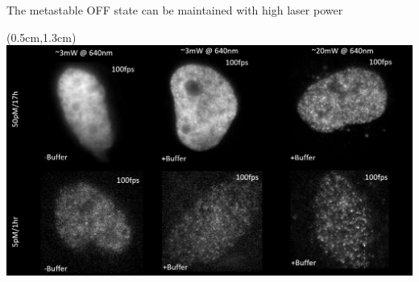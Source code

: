 \documentclass{beamer}					%
\begin{document}
\begin{frame}{The metastable OFF state can be maintained with high laser power}
\begin{textblock*}{14cm}(0.5cm,1.3cm)
\includegraphics[width=14cm]{Laser.png}
\end{textblock*}
\end{frame}
\end{document}
